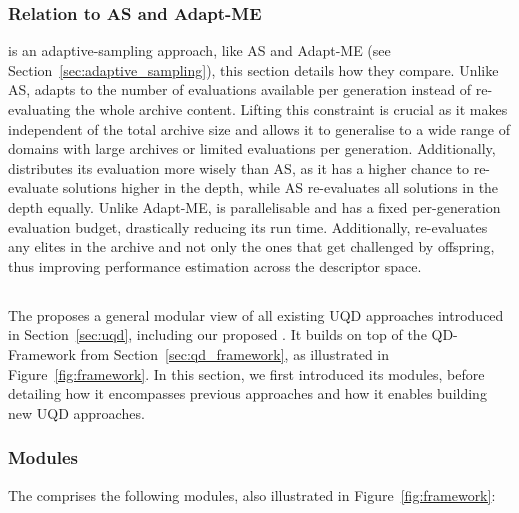 \subsubsection{Relation to AS and Adapt-ME} \name{} is an adaptive-sampling approach, like AS and Adapt-ME (see Section~\ref{sec:adaptive_sampling}), this section details how they compare.
Unlike AS, \name{} adapts to the number of evaluations available per generation instead of re-evaluating the whole archive content. Lifting this constraint is crucial as it makes \name{} independent of the total archive size and allows it to generalise to a wide range of domains with large archives or limited evaluations per generation. 
Additionally, \name{} distributes its evaluation more wisely than AS, as it has a higher chance to re-evaluate solutions higher in the depth, while AS re-evaluates all solutions in the depth equally. 
Unlike Adapt-ME, \name{} is parallelisable and has a fixed per-generation evaluation budget, drastically reducing its run time. 
Additionally, \name{} re-evaluates any elites in the archive and not only the ones that get challenged by offspring, thus improving performance estimation across the descriptor space. 


\subsection{\Longframework{}} \label{sec:framework}


The \framework{} proposes a general modular view of all existing UQD approaches introduced in Section~\ref{sec:uqd}, including our proposed \name{}. 
It builds on top of the QD-Framework from Section~\ref{sec:qd_framework}, as illustrated in Figure~\ref{fig:framework}. 
In this section, we first introduced its modules, before detailing how it encompasses previous approaches and how it enables building new UQD approaches. 

\subsubsection{Modules} The \framework{} comprises the following modules, also illustrated in Figure~\ref{fig:framework}:

